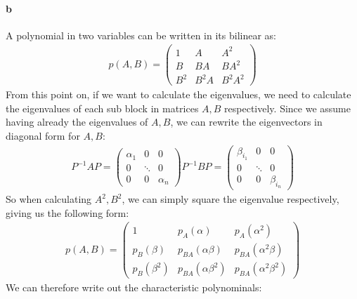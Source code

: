 \paragraph{b}
A polynomial in two variables can be written in its bilinear as:
\begin{gather*}
p(A,B) = \left( \begin{array}{ccc}
1 & A & A^2 \\
B & BA & BA^2\\
B^2 & B^2 A & B^2 A^2
\end{array} \right)
\end{gather*}
From this point on, if we want to calculate the eigenvalues, we need to calculate the eigenvalues of each sub block in matrices $A,B$ respectively.
Since we assume having already the eigenvalues of $A,B$, we can rewrite the eigenvectors in diagonal form for $A,B$:
\begin{gather*}
P^{-1}AP = \left( \begin{array}{ccc}
\alpha_1 & 0 & 0\\
0 & \ddots & 0 \\
0 & 0 & \alpha_n
\end{array} \right)
P^{-1}BP =\left( \begin{array}{ccc}
\beta_{i_1} & 0 & 0\\
0 & \ddots & 0 \\
0 & 0 & \beta_{i_n}
\end{array} \right)
\end{gather*}
So when calculating $A^2,B^2$, we can simply square the eigenvalue respectively, giving us the following form:
\begin{gather*}
p(A,B) =  \left( \begin{array}{ccc}
1 & p_A(\alpha) & p_A(\alpha^2)\\
p_B(\beta) & p_{BA}(\alpha \beta) & p_{BA}(\alpha^2 \beta)\\
p_B(\beta^2) & p_{BA}(\alpha \beta^2) & p_{BA}(\alpha^2 \beta^2)
\end{array} \right)
\end{gather*}
We can therefore write out the characteristic polynominals:
